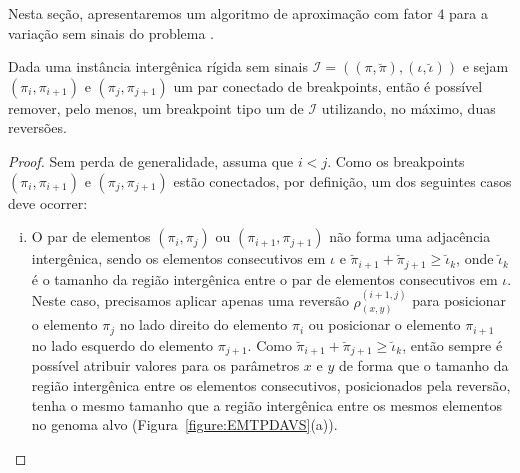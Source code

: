 Nesta seção, apresentaremos um algoritmo de aproximação com fator $4$ para a variação sem sinais do problema \SbIR{}.

\begin{lemma}\label{lemma:IMYFBWDY}
Dada uma instância intergênica rígida sem sinais $\mathcal{I}=((\pi,\breve\pi),(\iota,\breve\iota))$ e sejam $(\pi_i,\pi_{i+1})$ e $(\pi_j,\pi_{j+1})$ um par conectado de breakpoints, então é possível remover, pelo menos, um breakpoint tipo um de $\mathcal{I}$ utilizando, no máximo, duas reversões.
\end{lemma}
\begin{proof}
Sem perda de generalidade, assuma que $i < j$. Como os breakpoints $(\pi_i,\pi_{i+1})$ e $(\pi_j,\pi_{j+1})$ estão conectados, por definição, um dos seguintes casos deve ocorrer:
\begin{enumerate}[i.]
    \item O par de elementos $(\pi_i,\pi_{j})$ ou $(\pi_{i+1},\pi_{j+1})$ não forma uma adjacência intergênica, sendo os elementos consecutivos em $\iota$ e $\breve\pi_{i+1} + \breve\pi_{j+1} \ge \breve\iota_k$, onde $\breve\iota_k$ é o tamanho da região intergênica entre o par de elementos consecutivos em $\iota$. Neste caso, precisamos aplicar apenas uma reversão $\rho^{(i+1,j)}_{(x,y)}$ para posicionar o elemento $\pi_{j}$ no lado direito do elemento $\pi_{i}$ ou posicionar o elemento $\pi_{i+1}$ no lado esquerdo do elemento $\pi_{j+1}$. Como $\breve\pi_{i+1} + \breve\pi_{j+1} \ge \breve\iota_k$, então sempre é possível atribuir valores para os parâmetros $x$ e $y$ de forma que o tamanho da região intergênica entre os elementos consecutivos, posicionados pela reversão, tenha o mesmo tamanho que a região intergênica entre os mesmos elementos no genoma alvo (Figura~\ref{figure:EMTPDAVS}(a)).  

\end{enumerate}
\end{proof}
